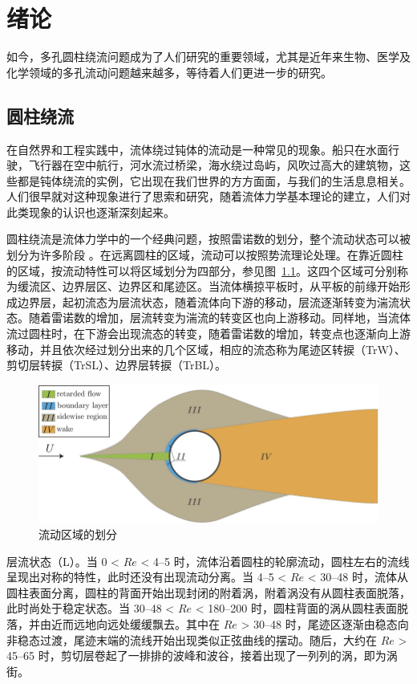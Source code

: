 \chapter{绪论}

如今，多孔圆柱绕流问题成为了人们研究的重要领域，尤其是近年来生物、医学及化学领域的多孔流动问题越来越多，等待着人们更进一步的研究。

\section{圆柱绕流}

在自然界和工程实践中，流体绕过钝体的流动是一种常见的现象。船只在水面行驶，飞行器在空中航行，河水流过桥梁，海水绕过岛屿，风吹过高大的建筑物，这些都是钝体绕流的实例，它出现在我们世界的方方面面，与我们的生活息息相关。人们很早就对这种现象进行了思索和研究，随着流体力学基本理论的建立，人们对此类现象的认识也逐渐深刻起来。

圆柱绕流是流体力学中的一个经典问题，按照雷诺数的划分，整个流动状态可以被划分为许多阶段 \cite{zdravkovich1997flow}。在远离圆柱的区域，流动可以按照势流理论处理。在靠近圆柱的区域，按流动特性可以将区域划分为四部分，参见图~\ref{fig: flow area}\cite{demartino2017aerodynamics}。这四个区域可分别称为缓流区、边界层区、边界区和尾迹区。当流体横掠平板时，从平板的前缘开始形成边界层，起初流态为层流状态，随着流体向下游的移动，层流逐渐转变为湍流状态。随着雷诺数的增加，层流转变为湍流的转变区也向上游移动。同样地，当流体流过圆柱时，在下游会出现流态的转变，随着雷诺数的增加，转变点也逐渐向上游移动，并且依次经过划分出来的几个区域，相应的流态称为尾迹区转捩（TrW）、剪切层转捩（TrSL）、边界层转捩（TrBL）。

\begin{figure}
	\centering
	\includegraphics[width=.8\textwidth]{figs/Regions-of-disturbed-flow-around-a-perfect-circular-cylinder}
	\caption{流动区域的划分 \cite{demartino2017aerodynamics}}
	\label{fig: flow area}
\end{figure}

层流状态（L）。当 0 < $Re$ < 4--5 时，流体沿着圆柱的轮廓流动，圆柱左右的流线呈现出对称的特性，此时还没有出现流动分离。当 4--5 < $Re$ < 30--48 时，流体从圆柱表面分离，圆柱的背面开始出现封闭的附着涡，附着涡没有从圆柱表面脱落，此时尚处于稳定状态。当 30--48 < $Re$ < 180--200 时，圆柱背面的涡从圆柱表面脱落，并由近而远地向远处缓缓飘去。其中在 $Re$ > 30--48 时，尾迹区逐渐由稳态向非稳态过渡，尾迹末端的流线开始出现类似正弦曲线的摆动。随后，大约在 $Re$ > 45--65 时，剪切层卷起了一排排的波峰和波谷，接着出现了一列列的涡，即为涡街。

